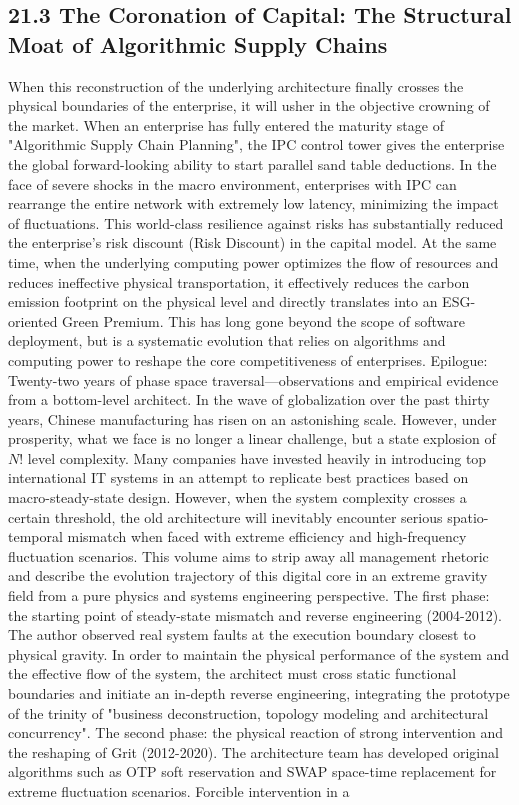 \documentclass[11pt,a4paper]{article}
\begin{document}
\subsection*{21.3 The Coronation of Capital: The Structural Moat of Algorithmic Supply Chains}


When this reconstruction of the underlying architecture finally crosses the physical boundaries of the enterprise, it will usher in the objective crowning of the market. When an enterprise has fully entered the maturity stage of "Algorithmic Supply Chain Planning", the IPC control tower gives the enterprise the global forward-looking ability to start parallel sand table deductions. In the face of severe shocks in the macro environment, enterprises with IPC can rearrange the entire network with extremely low latency, minimizing the impact of fluctuations. This world-class resilience against risks has substantially reduced the enterprise’s risk discount (Risk Discount) in the capital model. At the same time, when the underlying computing power optimizes the flow of resources and reduces ineffective physical transportation, it effectively reduces the carbon emission footprint on the physical level and directly translates into an ESG-oriented Green Premium. This has long gone beyond the scope of software deployment, but is a systematic evolution that relies on algorithms and computing power to reshape the core competitiveness of enterprises. Epilogue: Twenty-two years of phase space traversal—observations and empirical evidence from a bottom-level architect. In the wave of globalization over the past thirty years, Chinese manufacturing has risen on an astonishing scale. However, under prosperity, what we face is no longer a linear challenge, but a state explosion of $N!$ level complexity. Many companies have invested heavily in introducing top international IT systems in an attempt to replicate best practices based on macro-steady-state design. However, when the system complexity crosses a certain threshold, the old architecture will inevitably encounter serious spatio-temporal mismatch when faced with extreme efficiency and high-frequency fluctuation scenarios. This volume aims to strip away all management rhetoric and describe the evolution trajectory of this digital core in an extreme gravity field from a pure physics and systems engineering perspective. The first phase: the starting point of steady-state mismatch and reverse engineering (2004-2012). The author observed real system faults at the execution boundary closest to physical gravity. In order to maintain the physical performance of the system and the effective flow of the system, the architect must cross static functional boundaries and initiate an in-depth reverse engineering, integrating the prototype of the trinity of "business deconstruction, topology modeling and architectural concurrency". The second phase: the physical reaction of strong intervention and the reshaping of Grit (2012-2020). The architecture team has developed original algorithms such as OTP soft reservation and SWAP space-time replacement for extreme fluctuation scenarios. Forcible intervention in a 
\end{document}
